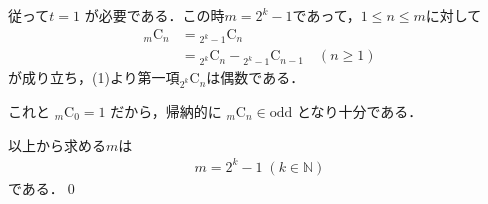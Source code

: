 \documentclass[../../main.tex]{subfiles}
\begin{document}
従って$t=1$ が必要である．この時$m=2^k-1$であって，$1\le n \le m$に対して
\begin{align}
  {}_m\mathrm{C}_n &= {}_{2^k-1}\mathrm{C}_n \\
  &= {}_{2^k}\mathrm{C}_n - {}_{2^k-1}\mathrm{C}_{n-1} \quad (n \ge 1)
\end{align}
が成り立ち，(1)より第一項${}_{2^k}\mathrm{C}_n$は偶数である．

これと ${}_m\mathrm{C}_0 = 1$ だから，帰納的に ${}_m\mathrm{C}_n \in \text{odd}$ となり十分である．

以上から求める$m$は
\begin{align}
  m = 2^k - 1 \; (k \in \mathbb{N})
\end{align}
である．\qed

\newpage
\end{document}
